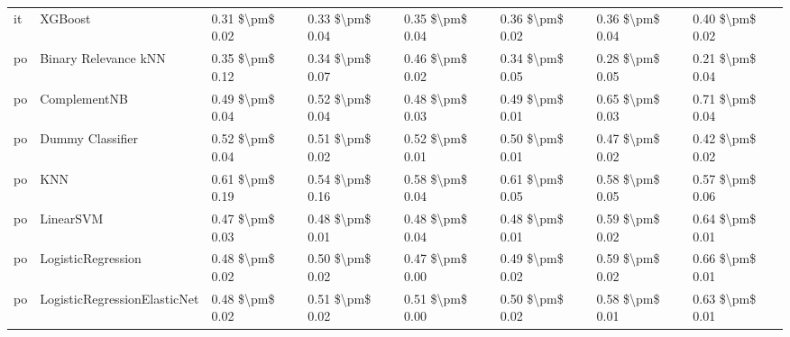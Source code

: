 \begin{tabular}{llllllll}
      it &                         XGBoost &     0.31 \$\textbackslash pm\$ 0.02 &           0.33 \$\textbackslash pm\$ 0.04 &       0.35 \$\textbackslash pm\$ 0.04 &        0.36 \$\textbackslash pm\$ 0.02 &                         0.36 \$\textbackslash pm\$ 0.04 &     0.40 \$\textbackslash pm\$ 0.02 \\
      po &            Binary Relevance kNN &     0.35 \$\textbackslash pm\$ 0.12 &           0.34 \$\textbackslash pm\$ 0.07 &       0.46 \$\textbackslash pm\$ 0.02 &        0.34 \$\textbackslash pm\$ 0.05 &                         0.28 \$\textbackslash pm\$ 0.05 &     0.21 \$\textbackslash pm\$ 0.04 \\
      po &                    ComplementNB &     0.49 \$\textbackslash pm\$ 0.04 &           0.52 \$\textbackslash pm\$ 0.04 &       0.48 \$\textbackslash pm\$ 0.03 &        0.49 \$\textbackslash pm\$ 0.01 &                         0.65 \$\textbackslash pm\$ 0.03 &     0.71 \$\textbackslash pm\$ 0.04 \\
      po &                Dummy Classifier &     0.52 \$\textbackslash pm\$ 0.04 &           0.51 \$\textbackslash pm\$ 0.02 &       0.52 \$\textbackslash pm\$ 0.01 &        0.50 \$\textbackslash pm\$ 0.01 &                         0.47 \$\textbackslash pm\$ 0.02 &     0.42 \$\textbackslash pm\$ 0.02 \\
      po &                             KNN &     0.61 \$\textbackslash pm\$ 0.19 &           0.54 \$\textbackslash pm\$ 0.16 &       0.58 \$\textbackslash pm\$ 0.04 &        0.61 \$\textbackslash pm\$ 0.05 &                         0.58 \$\textbackslash pm\$ 0.05 &     0.57 \$\textbackslash pm\$ 0.06 \\
      po &                       LinearSVM &     0.47 \$\textbackslash pm\$ 0.03 &           0.48 \$\textbackslash pm\$ 0.01 &       0.48 \$\textbackslash pm\$ 0.04 &        0.48 \$\textbackslash pm\$ 0.01 &                         0.59 \$\textbackslash pm\$ 0.02 &     0.64 \$\textbackslash pm\$ 0.01 \\
      po &              LogisticRegression &     0.48 \$\textbackslash pm\$ 0.02 &           0.50 \$\textbackslash pm\$ 0.02 &       0.47 \$\textbackslash pm\$ 0.00 &        0.49 \$\textbackslash pm\$ 0.02 &                         0.59 \$\textbackslash pm\$ 0.02 &     0.66 \$\textbackslash pm\$ 0.01 \\
      po &    LogisticRegressionElasticNet &     0.48 \$\textbackslash pm\$ 0.02 &           0.51 \$\textbackslash pm\$ 0.02 &       0.51 \$\textbackslash pm\$ 0.00 &        0.50 \$\textbackslash pm\$ 0.02 &                         0.58 \$\textbackslash pm\$ 0.01 &     0.63 \$\textbackslash pm\$ 0.01 \\

\end{tabular}
